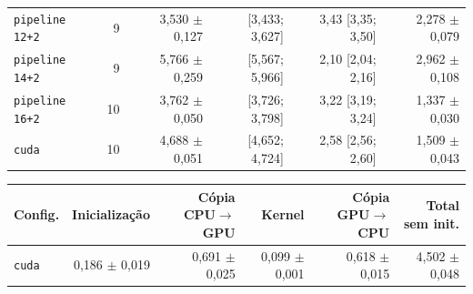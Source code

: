 \begin{tabular}{lrrrrr}
\texttt{pipeline 12+2} & 9 & 3,530 $\pm$ 0,127 & [3,433; 3,627] & 3,43 [3,35; 3,50] & 2,278 $\pm$ 0,079 \\
\texttt{pipeline 14+2} & 9 & 5,766 $\pm$ 0,259 & [5,567; 5,966] & 2,10 [2,04; 2,16] & 2,962 $\pm$ 0,108 \\
\texttt{pipeline 16+2} & 10 & 3,762 $\pm$ 0,050 & [3,726; 3,798] & 3,22 [3,19; 3,24] & 1,337 $\pm$ 0,030 \\
\texttt{cuda} & 10 & 4,688 $\pm$ 0,051 & [4,652; 4,724] & 2,58 [2,56; 2,60] & 1,509 $\pm$ 0,043 \\
\hline
\end{tabular}

\begin{tabular}{lrrrrr}
\hline
\textbf{Config.} & \textbf{Inicializa\c{c}\~ao} & \textbf{C\'opia CPU$\to$GPU} & \textbf{Kernel} & \textbf{C\'opia GPU$\to$CPU} & \textbf{Total sem init.} \\
\hline
\texttt{cuda} & 0,186 $\pm$ 0,019 & 0,691 $\pm$ 0,025 & 0,099 $\pm$ 0,001 & 0,618 $\pm$ 0,015 & 4,502 $\pm$ 0,048 \\
\hline
\end{tabular}


